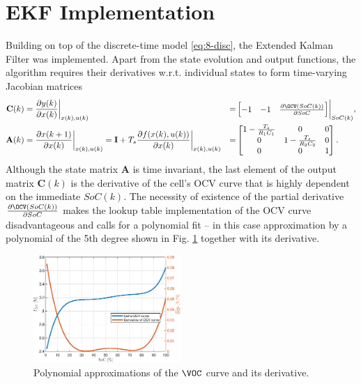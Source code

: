 \section{EKF Implementation}

Building on top of the discrete-time model \eqref{eq:8-disc}, the Extended Kalman Filter was implemented. Apart from the state evolution and output functions, the algorithm requires their derivatives w.r.t. individual states to form time-varying Jacobian matrices
\begin{align}
    \mathbf{C}(k) &= \frac{\partial y(k)}{\partial x(k)}\biggr\rvert_{x(k),u(k)} &=& \begin{bmatrix} -1 & -1 & \frac{\partial \OCV(SoC(k))}{\partial SoC} \end{bmatrix}\biggr\rvert_{SoC(k)}, \\
        \mathbf{A}(k) &= \frac{\partial x(k+1)}{\partial x(k)}\biggr\rvert_{x(k),u(k)} = \mathbf{I} + T_s \frac{\partial f(x(k), u(k))}{\partial x(k)}\biggr\rvert_{x(k),u(k)} &=& \begin{bmatrix}
            1 - \frac{T_s}{R_1 C_1} & 0 & 0 \\ 0 & 1 - \frac{T_s}{R_2 C_2} & 0 \\ 0 & 0 & 1
        \end{bmatrix}.
\end{align}
Although the state matrix $\mathbf{A}$ is time invariant, the last element of the output matrix $\mathbf{C}(k)$ is the derivative of the cell's OCV curve that is highly dependent on the immediate $SoC(k)$. The necessity of existence of the partial derivative $\frac{\partial \OCV(SoC(k))}{\partial SoC}$ makes the lookup table implementation of the OCV curve disadvantageous and calls for a polynomial fit -- in this case approximation by a polynomial of the 5th degree shown in Fig. \ref{fig:8-ocv} together with its derivative.

\begin{figure}[H]
    \centering
    \includegraphics[width=0.5\textwidth]{figures/8/ocv_to_soc.eps}
    \caption{Polynomial approximations of the $\VOC$ curve and its derivative.}
    \label{fig:8-ocv}
\end{figure}

